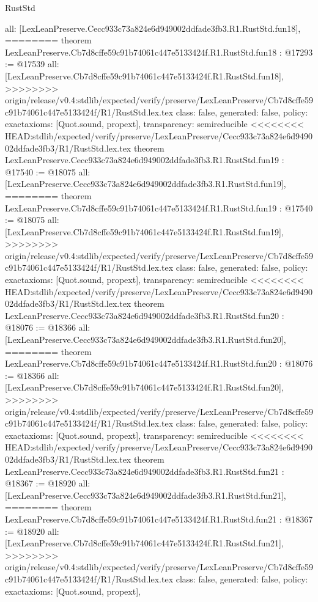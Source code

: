 \begin{lexlean}{RustStd}
\begin{coremodule}
{\begin{coremodule}
{{{{{{{{{{{{{{{{{{{{{  all: [LexLeanPreserve.Cecc933c73a824e6d949002ddfade3fb3.R1.RustStd.fun18],
========
theorem LexLeanPreserve.Cb7d8cffe59c91b74061c447e5133424f.R1.RustStd.fun18 : @17293 := @17539 {
  all: [LexLeanPreserve.Cb7d8cffe59c91b74061c447e5133424f.R1.RustStd.fun18],
>>>>>>>> origin/release/v0.4:stdlib/expected/verify/preserve/LexLeanPreserve/Cb7d8cffe59c91b74061c447e5133424f/R1/RustStd.lex.tex
  class: false,
  generated: false,
  policy: exact{axioms: [Quot.sound, propext]},
  transparency: semireducible
}
<<<<<<<< HEAD:stdlib/expected/verify/preserve/LexLeanPreserve/Cecc933c73a824e6d949002ddfade3fb3/R1/RustStd.lex.tex
theorem LexLeanPreserve.Cecc933c73a824e6d949002ddfade3fb3.R1.RustStd.fun19 : @17540 := @18075 {
  all: [LexLeanPreserve.Cecc933c73a824e6d949002ddfade3fb3.R1.RustStd.fun19],
========
theorem LexLeanPreserve.Cb7d8cffe59c91b74061c447e5133424f.R1.RustStd.fun19 : @17540 := @18075 {
  all: [LexLeanPreserve.Cb7d8cffe59c91b74061c447e5133424f.R1.RustStd.fun19],
>>>>>>>> origin/release/v0.4:stdlib/expected/verify/preserve/LexLeanPreserve/Cb7d8cffe59c91b74061c447e5133424f/R1/RustStd.lex.tex
  class: false,
  generated: false,
  policy: exact{axioms: [Quot.sound, propext]},
  transparency: semireducible
}
<<<<<<<< HEAD:stdlib/expected/verify/preserve/LexLeanPreserve/Cecc933c73a824e6d949002ddfade3fb3/R1/RustStd.lex.tex
theorem LexLeanPreserve.Cecc933c73a824e6d949002ddfade3fb3.R1.RustStd.fun20 : @18076 := @18366 {
  all: [LexLeanPreserve.Cecc933c73a824e6d949002ddfade3fb3.R1.RustStd.fun20],
========
theorem LexLeanPreserve.Cb7d8cffe59c91b74061c447e5133424f.R1.RustStd.fun20 : @18076 := @18366 {
  all: [LexLeanPreserve.Cb7d8cffe59c91b74061c447e5133424f.R1.RustStd.fun20],
>>>>>>>> origin/release/v0.4:stdlib/expected/verify/preserve/LexLeanPreserve/Cb7d8cffe59c91b74061c447e5133424f/R1/RustStd.lex.tex
  class: false,
  generated: false,
  policy: exact{axioms: [Quot.sound, propext]},
  transparency: semireducible
}
<<<<<<<< HEAD:stdlib/expected/verify/preserve/LexLeanPreserve/Cecc933c73a824e6d949002ddfade3fb3/R1/RustStd.lex.tex
theorem LexLeanPreserve.Cecc933c73a824e6d949002ddfade3fb3.R1.RustStd.fun21 : @18367 := @18920 {
  all: [LexLeanPreserve.Cecc933c73a824e6d949002ddfade3fb3.R1.RustStd.fun21],
========
theorem LexLeanPreserve.Cb7d8cffe59c91b74061c447e5133424f.R1.RustStd.fun21 : @18367 := @18920 {
  all: [LexLeanPreserve.Cb7d8cffe59c91b74061c447e5133424f.R1.RustStd.fun21],
>>>>>>>> origin/release/v0.4:stdlib/expected/verify/preserve/LexLeanPreserve/Cb7d8cffe59c91b74061c447e5133424f/R1/RustStd.lex.tex
  class: false,
  generated: false,
  policy: exact{axioms: [Quot.sound, propext]},
}}}}}}}}}}}}}}}}}}}}}}}}}
\end{coremodule}}
\end{coremodule}
\end{lexlean}
